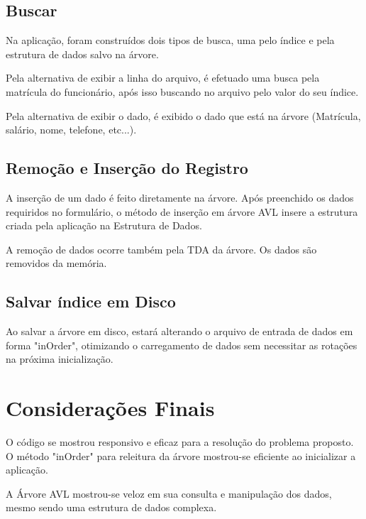 \documentclass[12pt]{article}
\begin{document}
\subsection{Buscar}

Na aplicação, foram construídos dois tipos de busca, uma pelo índice e pela estrutura de dados salvo na árvore.

Pela alternativa de exibir a linha do arquivo, é efetuado uma busca pela matrícula do funcionário, após isso buscando no arquivo pelo valor do seu índice.

Pela alternativa de exibir o dado, é exibido o dado que está na árvore (Matrícula, salário, nome, telefone, etc...).

\subsection{Remoção e Inserção do Registro}

A inserção de um dado é feito diretamente na árvore. Após preenchido os dados requiridos no formulário, o método de inserção em árvore AVL insere a estrutura criada pela aplicação na Estrutura de Dados.

A remoção de dados ocorre também pela TDA da árvore. Os dados são removidos da memória.

\subsection{Salvar índice em Disco}

Ao salvar a árvore em disco, estará alterando o arquivo de entrada de dados em forma "inOrder", otimizando o carregamento de dados sem necessitar as rotações na próxima inicialização.

\section{Considerações Finais}

O código se mostrou responsivo e eficaz para a resolução do problema proposto. O método "inOrder" para releitura da árvore mostrou-se eficiente ao inicializar a aplicação. 

A Árvore AVL mostrou-se veloz em sua consulta e manipulação dos dados, mesmo sendo uma estrutura de dados complexa.
\end{document}
